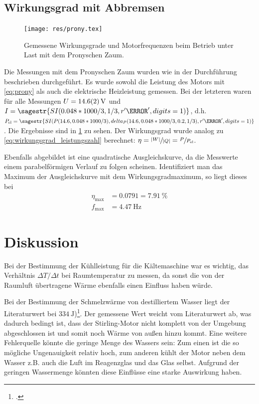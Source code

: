 



\subsection{Wirkungsgrad mit Abbremsen}
\begin{figure}
	\centering
	\texttt{[image: res/prony.tex]}
	\caption{Gemessene Wirkungsgrade und Motorfrequenzen beim Betrieb unter Last mit dem Pronyschen Zaum. \label{fig:prony}}
\end{figure}
Die Messungen mit dem Pronyschen Zaum wurden wie in der Durchführung beschrieben durchgeführt. Es wurde sowohl die Leistung des Motors mit \cref{eq:prony} als auch die elektrische Heizleistung gemessen. Bei der letzteren waren für alle Messungen $U = \SI{14.6 +- 0.2}{\V}$ und $I = \sagestr{SI(0.048*1000/3, 1/3, r'\A', digits=1)}$, d.h. $P_\text{el} = \sagestr{SI(P(14.6, 0.048*1000/3), delta_P(14.6, 0.048*1000/3, 0.2, 1/3), r'\W', digits=1)}$. Die Ergebnisse sind in \cref{fig:prony} zu sehen. Der Wirkungsgrad wurde analog zu \cref{eq:wirkungsgrad_leistungszahl} berechnet: $\eta = \sfrac{\abs{W}}{\abs{Q}} = \sfrac{P}{P_\text{el}}$.

Ebenfalls abgebildet ist eine quadratische Ausgleichskurve, da die Messwerte einem parabelförmigen Verlauf zu folgen scheinen. Identifiziert man das Maximum der Ausgleichskurve mit dem Wirkungsgradmaximum, so liegt dieses bei
\begin{align*}
\eta_\text{max} &= \num{0.0791} = \SI{7.91}{\%}\\
f_\text{max} &= \SI{4.47}{\Hz}
\end{align*}


\section{Diskussion}
Bei der Bestimmung der Kühlleistung für die Kältemaschine war es wichtig, das Verhältnis $\Delta T/\Delta t$ bei Raumtemperatur zu messen, da sonst die von der Raumluft übertragene Wärme ebenfalls einen Einfluss haben würde.

Bei der Bestimmung der Schmelzwärme von destilliertem Wasser liegt der Literaturwert bei $\SI{334}{\J}$)\footcite[S. 636]{taschenbuch}. Der gemessene Wert weicht vom Literaturwert ab, was dadurch bedingt ist, dass der Stirling-Motor nicht komplett von der Umgebung abgeschlossen ist und somit noch Wärme von außen hinzu kommt. Eine weitere Fehlerquelle könnte die geringe Menge des Wassers sein: Zum einen ist die so mögliche Ungenauigkeit relativ hoch, zum anderen kühlt der Motor neben dem Wasser z.B. auch die Luft im Reagenzglas und das Glas selbst. Aufgrund der geringen Wassermenge könnten diese Einflüsse eine starke Auswirkung haben.


